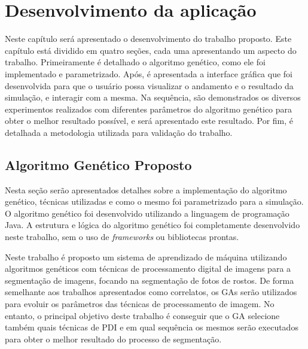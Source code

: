 \documentclass[12pt,oneside,a4paper,english,french,spanish,brazil,]{abntex2}
\begin{document}
\chapter{Desenvolvimento da aplicação}
\label{chap:Desenvolvimento}

Neste capítulo será apresentado o desenvolvimento do trabalho proposto. Este capítulo está dividido em quatro seções, cada uma apresentando um aspecto do trabalho. Primeiramente é detalhado o algoritmo genético, como ele foi implementado e parametrizado. Após, é apresentada a interface gráfica que foi desenvolvida para que o usuário possa visualizar o andamento e o resultado da simulação, e interagir com a mesma. Na sequência, são demonstrados os diversos experimentos realizados com diferentes parâmetros do algoritmo genético para obter o melhor resultado possível, e será apresentado este resultado. Por fim, é detalhada a metodologia utilizada para validação do trabalho.

\section{Algoritmo Genético Proposto}

Nesta seção serão apresentados detalhes sobre a implementação do algoritmo genético, técnicas utilizadas e como o mesmo foi parametrizado para a simulação. O algoritmo genético foi desenvolvido utilizando a linguagem de programação Java. A estrutura e lógica do algoritmo genético foi completamente desenvolvido neste trabalho, sem o uso de \textit{frameworks} ou bibliotecas prontas.

Neste trabalho é proposto um sistema de aprendizado de máquina utilizando algoritmos genéticos com técnicas de processamento digital de imagens para a segmentação de imagens, focando na segmentação de fotos de rostos. De forma semelhante aos trabalhos apresentados como correlatos, os GAs serão utilizados para evoluir os parâmetros das técnicas de processamento de imagem. No entanto, o principal objetivo deste trabalho é conseguir que o GA selecione também quais técnicas de PDI e em qual sequência os mesmos serão executados para obter o melhor resultado do processo de segmentação.
\end{document}
